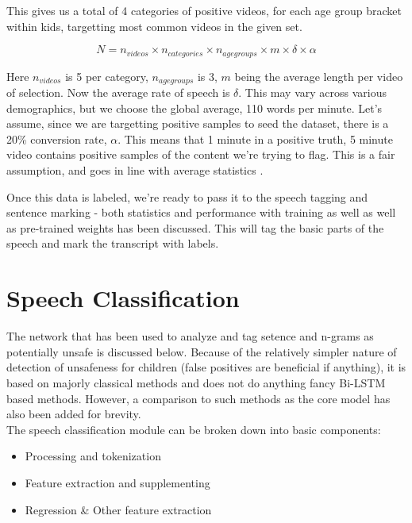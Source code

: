 \documentclass{article}
\begin{document}
This gives us a total of 4 categories of positive videos, for each age group bracket within kids, targetting most common videos in the given set.

$$
N = n_{videos} \times n_{categories} \times n_{age groups} \times m \times \delta \times \alpha
$$

Here $n_{videos}$ is 5 per category, $n_{age groups}$ is 3, $m$ being the average length per video of selection. Now the average rate of speech
is $\delta$. This may vary across various demographics, but we choose the global average, 110 words per minute. Let's assume, since we are targetting
positive samples to seed the dataset, there is a 20\% conversion rate, $\alpha$. This means that 1 minute in a positive truth, 5 minute video contains
positive samples of the content we're trying to flag. This is a fair assumption, and goes in line with average statistics \citep{videostats}.

Once this data is labeled, we're ready to pass it to the speech tagging and sentence marking - both statistics and performance with training as well
as well as pre-trained weights has been discussed. This will tag the basic parts of the speech and mark the transcript with labels.

\section{Speech Classification}

The network that has been used to analyze and tag setence and n-grams as potentially unsafe is discussed below. Because of the relatively simpler nature
of detection of unsafeness for children (false positives are beneficial if anything), it is based on majorly classical methods and does not do anything
fancy \citep{bilstm} Bi-LSTM based methods. However, a comparison to such methods as the core model has also been added for brevity. \\

The speech classification module can be broken down into basic components:
\begin{itemize}
    \item{Processing and tokenization}
    \item{Feature extraction and supplementing}
    \item{Regression \& Other feature extraction}
\end{itemize}

\end{document}
